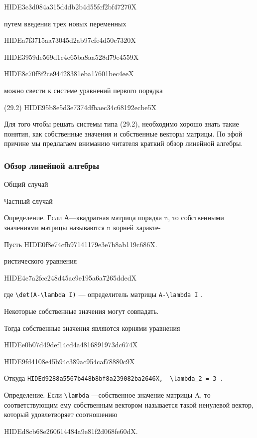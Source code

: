 \documentclass[
  ukrainian,
]{article}
\begin{document}
HIDE3c3d084a315d4db2b4d55fcf2bf47270X

путем введения трех новых переменных

HIDEa7f3715aa73045d2ab97cfe4d50c7320X

HIDE3959de569d1c4e65ba8aa528d79e4559X

HIDE8c70f8f2ce94428381eba17601bec4eeX

можно свести к системе уравнений первого порядка

(29.2) HIDE95b8e5d3e7374dfbaec34c68192ecbe5X

Для того чтобы решать системы типа (29.2), необходимо хорошо знать такие
понятия, как собственные значения и собственные векторы матрицы. По эфой
причине мы предлагаем вниманию читателя краткий обзор линейной алгебры.

\subsubsection{Обзор линейной
алгебры}\label{ux43eux431ux437ux43eux440-ux43bux438ux43dux435ux439ux43dux43eux439-ux430ux43bux433ux435ux431ux440ux44b}

Общий случай

Частный случай

Определение. Если А---квадратная матрица порядка n, то собственными
значениями матрицы называются n корней характе-

Пусть HIDE0f8e74cfb97141179e3e7b8ab119c686X.

ристического уравнения

HIDE4c7a2fcc248d45ac9e195a6a7265ddedX

где \texttt{\textbackslash{}det(A-\textbackslash{}lambda\ I)} ---
определитель матрицы \texttt{A-\textbackslash{}lambda\ I} .

Некоторые собственные значения могут совпадать.

Тогда собственные значения являются корнями уравнения

HIDEe0b07d49def14cd4a4816891973dc674X

HIDE9fd4108e45b94c389ac954caf78880c9X

Откуда
\texttt{HIDEd9288a5567b448b8bf8a239082ba2646X,\ \ \textquotesingle{}\textbackslash{}lambda\_2\ =\ 3\textquotesingle{}\ .}

Определение. Если \texttt{\textbackslash{}lambda} ---собственное
значение матрицы A, то соответствующим ему собственным вектором
называется такой ненулевой вектор, который удовлетворяет соотношению

HIDEd8cb68e260614484a9e81f2d068fe60dX.
\end{document}

